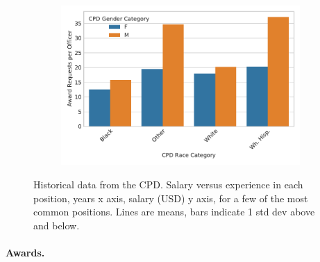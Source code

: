 \begin{figure}[t!] 
\begin{subfigure}{0.43\textwidth}
\end{subfigure}
\begin{subfigure}{0.53\textwidth}
\includegraphics[width=\textwidth]{figs/awards} 
\end{subfigure}
\caption{Historical data from the CPD. Salary versus experience in each
position, years x axis, salary (USD) y axis, for a few of the most common
positions. Lines are means, bars indicate 1 std dev above and below.} \label{fig:salary}
\end{figure}

\paragraph{Awards.}


